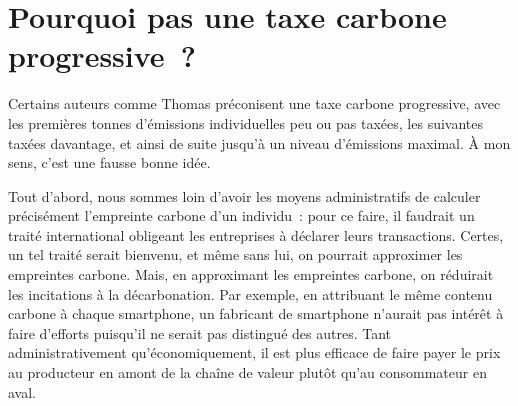 \documentclass[a5paper,french,openany]{memoir}
\begin{document}
\section*{\normalsize Pourquoi pas une taxe carbone progressive~?}\label{q:taxe_progressive}

Certains auteurs comme Thomas \cite{piketty_capital_2019} préconisent une taxe carbone progressive, avec les premières tonnes d'émissions individuelles peu ou pas taxées, les suivantes taxées davantage, et ainsi de suite jusqu'à un niveau d'émissions maximal. À mon sens, c'est une fausse bonne idée. 

Tout d'abord, nous sommes loin d'avoir les moyens administratifs de calculer précisément l'empreinte carbone d'un individu~: pour ce faire, il faudrait un traité international obligeant les entreprises à déclarer leurs transactions. Certes, un tel traité serait bienvenu, et même sans lui, on pourrait approximer les empreintes carbone. Mais, en approximant les empreintes carbone, on réduirait les incitations à la décarbonation. Par exemple, en attribuant le même contenu carbone à chaque smartphone, un fabricant de smartphone n'aurait pas intérêt à faire d'efforts puisqu'il ne serait pas distingué des autres. Tant administrativement qu'économiquement, il est plus efficace de faire payer le prix au producteur en amont de la chaîne de valeur plutôt qu'au consommateur en aval. 
\end{document}
